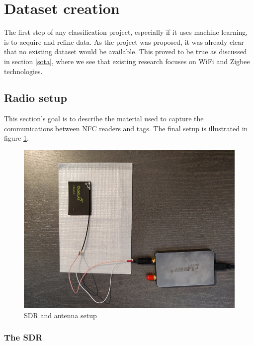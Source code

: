 \section{Dataset creation}

The first step of any classification project, especially if it uses machine learning, is to acquire and refine data. As the project was proposed, it was already clear that no existing dataset would be available. This proved to be true as discussed in section \ref{sota}, where we see that existing research focuses on WiFi and Zigbee technologies.

\subsection{Radio setup}

This section's goal is to describe the material used to capture the communications between NFC readers and tags. The final setup is illustrated in figure \ref{fig:radio-setup}.

\begin{figure}[htp!]
  \centering
  \includegraphics[scale=0.35]{figures/data_sdr-setup2.jpg}
  \caption{SDR and antenna setup}
  \label{fig:radio-setup}
\end{figure}

\subsubsection{The SDR}


